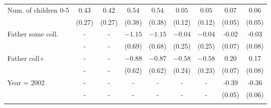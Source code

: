 \begin{tabular}{lcccccccc}
Num. of children 0-5&$0.43$&$0.42$&$0.54$&$0.54$&$0.05$&$0.05$&0.07&0.06\\
&(0.27)&(0.27)&(0.38)&(0.38)&(0.12)&(0.12)&(0.05)&(0.05)\\
Father some coll.&-&-&$-1.15$&$-1.15$&$-0.04$&$-0.04$&-0.02&-0.03\\
&-&-&(0.69)&(0.68)&(0.25)&(0.25)&(0.07)&(0.08)\\
Father coll+&-&-&$-0.88$&$-0.87$&$-0.58$&$-0.58$&0.20&0.17\\
&-&-&(0.62)&(0.62)&(0.24)&(0.23)&(0.07)&(0.08)\\
Year = 2002&-&-&-&-&-&-&-0.39&-0.36\\
&-&-&-&-&-&-&(0.05)&(0.06)\\
\\
\bottomrule\end{tabular}